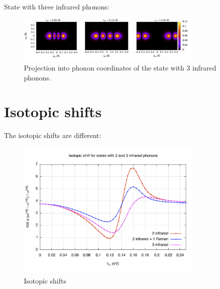 State with three infrared phonons:

\begin{figure}[ht!]
  \centering
  \includegraphics[width=0.8\textwidth]{images/ph-third_infrared.png}
  \caption{Projection into phonon coordinates of the state with 3 infrared phonons.}
  \label{fig:ph-third_infrared}
\end{figure}

\section{Isotopic shifts}

The isotopic shifts are different:

\begin{figure}[ht!]
  \centering
  \includegraphics[width=0.8\textwidth]{images/isot-2_3ir.jpg}
  \caption{Isotopic shifts}
  \label{fig:isot-2_3ir}
\end{figure}
